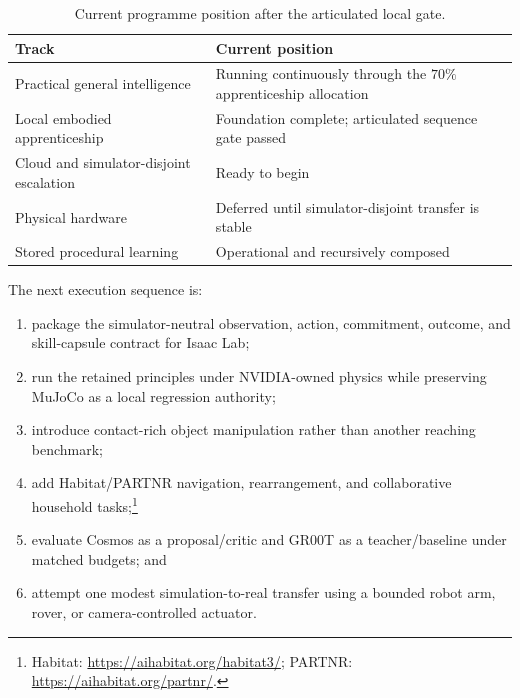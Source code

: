 \begin{table}[htbp]
\centering
\caption{Current programme position after the articulated local gate.}
\label{tab:embodied-programme-position}
\begin{tabularx}{\linewidth}{@{}>{\raggedright\arraybackslash}X
                                  >{\raggedright\arraybackslash}X@{}}
\toprule
\textbf{Track} & \textbf{Current position} \\
\midrule
Practical general intelligence & Running continuously through the $70\%$ apprenticeship allocation \\
Local embodied apprenticeship & Foundation complete; articulated sequence gate passed \\
Cloud and simulator-disjoint escalation & Ready to begin \\
Physical hardware & Deferred until simulator-disjoint transfer is stable \\
Stored procedural learning & Operational and recursively composed \\
\bottomrule
\end{tabularx}
\end{table}

The next execution sequence is:
\begin{enumerate}[leftmargin=*]
  \item package the simulator-neutral observation, action, commitment, outcome,
        and skill-capsule contract for Isaac Lab;
  \item run the retained principles under NVIDIA-owned physics while preserving
        MuJoCo as a local regression authority;
  \item introduce contact-rich object manipulation rather than another reaching
        benchmark;
  \item add Habitat/PARTNR navigation, rearrangement, and collaborative
        household tasks;\footnote{Habitat: \url{https://aihabitat.org/habitat3/};
        PARTNR: \url{https://aihabitat.org/partnr/}.}
  \item evaluate Cosmos as a proposal/critic and GR00T as a teacher/baseline
        under matched budgets; and
  \item attempt one modest simulation-to-real transfer using a bounded robot
        arm, rover, or camera-controlled actuator.
\end{enumerate}

